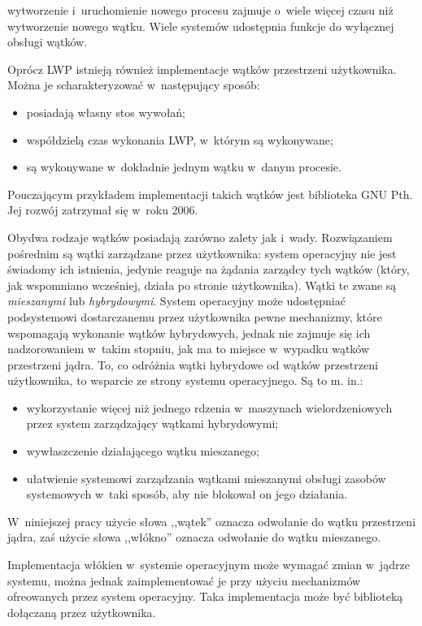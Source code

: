 \documentclass[12pt]{mwart}
\newcounter{figmain}
\newcommand{\myownfigure}[4]{ \newcounter{#1} \setcounter{#1}{\value{figmain}} \addtocounter{figmain}{1} \begin{center} \label{fig:#1} \centering \texttt{[image: \#2]}\\ \nopagebreak[5] \parbox[t]{11.5cm}{Rysunek \arabic{#1}. #3.} \end{center}}
\begin{document}
  wytworzenie i~uruchomienie nowego procesu zajmuje o~wiele więcej czasu niż wytworzenie nowego wątku. Wiele systemów
  udostępnia funkcje do wyłącznej obsługi wątków.
\par
%
\indent
  Oprócz LWP istnieją również implementacje wątków przestrzeni użytkownika. Można je scharakteryzować w~następujący sposób:
  \begin{itemize}
    \item posiadają własny stos wywołań;
    \item współdzielą czas wykonania LWP, w~którym są wykonywane;
    \item są wykonywane w~dokładnie jednym wątku w~danym procesie.
  \end{itemize}
  Pouczającym przykładem implementacji takich wątków jest biblioteka GNU Pth. Jej rozwój zatrzymał się w~roku 2006.
\par
%
\indent
	Obydwa rodzaje wątków posiadają zarówno zalety jak i~wady. Rozwiązaniem pośrednim są wątki zarządzane przez użytkownika:
  system operacyjny nie jest świadomy ich istnienia, jedynie reaguje na żądania zarządcy tych wątków (który, jak wspomniano wcześniej,
  działa po stronie użytkownika). Wątki te zwane są \emph{mieszanymi} lub \emph{hybrydowymi}. 
  System operacyjny może udostępniać podsystemowi dostarczanemu przez użytkownika pewne mechanizmy,
  które wspomagają wykonanie wątków hybrydowych, jednak nie zajmuje się ich nadzorowaniem w~takim stopniu, jak ma to miejsce w~wypadku
  wątków przestrzeni jądra. To, co odróżnia wątki hybrydowe od wątków przestrzeni użytkownika, to wsparcie ze strony systemu operacyjnego.
  Są to m. in.:
  \begin{itemize}
    \item wykorzystanie więcej niż jednego rdzenia w~maszynach wielordzeniowych przez system zarządzający wątkami hybrydowymi;
    \item wywłaszczenie działającego wątku mieszanego;
    \item ułatwienie systemowi zarządzania wątkami mieszanymi obsługi zasobów systemowych w~taki sposób, aby nie blokował on jego działania.
  \end{itemize}
\par
%
\indent
  W~niniejszej pracy użycie słowa ,,wątek'' oznacza odwołanie do wątku przestrzeni jądra, zaś użycie słowa ,,włókno'' oznacza odwołanie
  do wątku mieszanego.
\par
%
\begin{comment}
\indent
  \myownfigure{mixedintro}{mixedscheme.png}{Włókna w~implementacji nie wymagającej zmian w~systemie~operacyjnym -- cel niniejszej pracy}{.23}
\par
\end{comment}
\indent
  Implementacja włókien w~systemie operacyjnym może wymagać zmian w~jądrze systemu,
  można jednak zaimplementować je przy użyciu mechanizmów ofreowanych przez system operacyjny.
  Taka implementacja może być biblioteką dołączaną przez użytkownika.
\par
%
\end{document}
